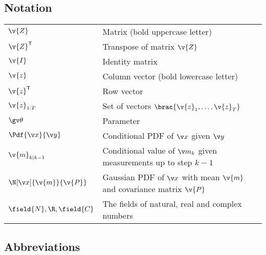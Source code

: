 \subsection*{Notation}
\begin{tabular}{ll}
$\v{Z}$  & Matrix (bold uppercase letter)  \\
$\v{Z}^\tr$  & Transpose of matrix $\v{Z}$  \\
$\v{I}$ & Identity matrix \\
$\v{z}$ & Column vector (bold lowercase letter) \\
$\v{z}^\tr$ & Row vector \\
$\v{z}_{1:T}$    & Set of vectors $\brac{\v{z}_1,\dots,\v{z}_T}$\\
$\Th$            & Parameter\\
$\Pdf{\x}{\y}$   & Conditional PDF of $\x$ given $\y$\\
$\v{m}_{k|k-1}$   & Conditional value of $\m_k$ given measurements up to step $k-1$\\
$\N[\x]{\v{m}}{\v{P}}$ & Gaussian PDF of $\x$ with mean $\v{m}$ and covariance matrix $\v{P}$\\
$\field{N},\R,\field{C}$ & The fields of natural, real and complex numbers
\end{tabular}
\subsection*{Abbreviations}

